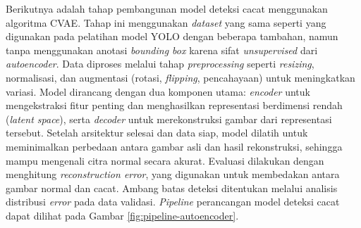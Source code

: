 Berikutnya adalah tahap pembangunan model deteksi cacat menggunakan
algoritma CVAE. Tahap ini menggunakan
\textit{dataset}
yang sama seperti yang digunakan pada pelatihan model YOLO dengan
beberapa tambahan, namun
tanpa menggunakan anotasi \textit{bounding box} karena sifat
\textit{unsupervised} dari
\textit{autoencoder}. Data diproses melalui tahap \textit{preprocessing} seperti
\textit{resizing}, normalisasi, dan augmentasi (rotasi,
\textit{flipping}, pencahayaan)
untuk meningkatkan variasi. Model dirancang dengan dua komponen
utama: \textit{encoder} untuk mengekstraksi fitur penting dan menghasilkan
representasi berdimensi rendah (\textit{latent space}), serta
\textit{decoder} untuk
merekonstruksi gambar dari representasi tersebut. Setelah arsitektur
selesai dan data siap, model dilatih untuk meminimalkan perbedaan
antara gambar asli dan hasil rekonstruksi, sehingga mampu mengenali
citra normal secara akurat. Evaluasi dilakukan dengan menghitung
\textit{reconstruction error}, yang digunakan untuk membedakan antara gambar
normal dan cacat. Ambang batas deteksi ditentukan melalui analisis
distribusi \textit{error} pada data validasi. \textit{Pipeline}
perancangan model
deteksi cacat dapat dilihat pada Gambar \ref{fig:pipeline-autoencoder}.


